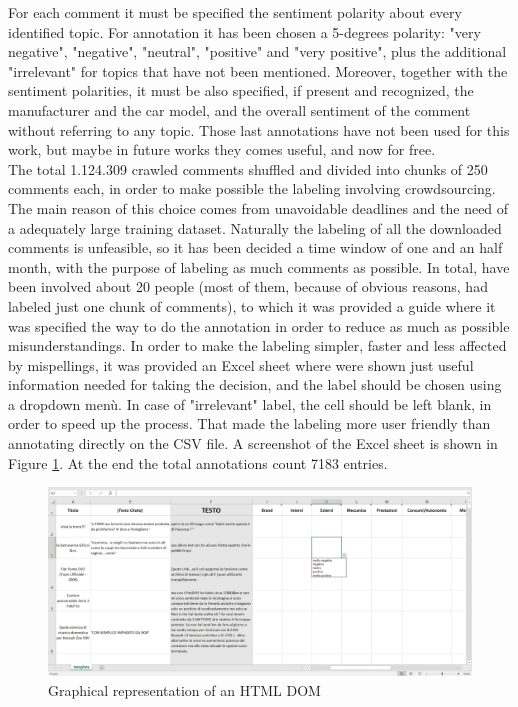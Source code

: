 For each comment it must be specified the sentiment polarity about every identified topic. For annotation it has been chosen a 5-degrees polarity: "very negative", "negative", "neutral", "positive" and "very positive", plus the additional "irrelevant" for topics that have not been mentioned. Moreover, together with the sentiment polarities, it must be also specified, if present and recognized, the manufacturer and the car model, and the overall sentiment of the comment without referring to any topic. Those last annotations have not been used for this work, but maybe in future works they comes useful, and now for free.\\
The total 1.124.309 crawled comments shuffled and divided into chunks of 250 comments each, in order to make possible the labeling involving crowdsourcing. The main reason of this choice comes from unavoidable deadlines and the need of a adequately large training dataset. Naturally the labeling of all the downloaded comments is unfeasible, so it has been decided a time window of one and an half month, with the purpose of labeling as much comments as possible. In total, have been involved about 20 people (most of them, because of obvious reasons, had labeled just one chunk of comments), to which it was provided a guide where it was specified the way to do the annotation in order to reduce as much as possible misunderstandings. In order to make the labeling simpler, faster and less affected by mispellings, it was provided an Excel sheet where were shown just useful information needed for taking the decision, and the label should be chosen using a dropdown menù. In case of "irrelevant" label, the cell should be left blank, in order to speed up the process. That made the labeling more user friendly than annotating directly on the CSV file. A screenshot of the Excel sheet is shown in Figure \ref{fig:excel-sheet}. At the end the total annotations count 7183 entries.\\


\begin{figure}[ht]
	\centering
	\includegraphics[width=1\textwidth]{figures/screen/excel-sheet.png}
	\caption{Graphical representation of an HTML DOM}
	\label{fig:excel-sheet}
\end{figure}


